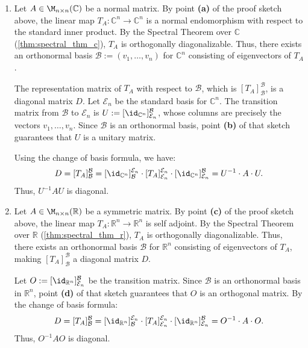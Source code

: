 \begin{exercisesolution}
\label{sol:spectral_thm_matrices}
\begin{enumerate}[label=\textbf{(\alph*)}]
    \item Let $A \in \M_{n \times n}(\mathbb{C})$ be a normal matrix. By point \textbf{(a)} of the proof sketch above, the linear map $T_A \colon \mathbb{C}^n \to \mathbb{C}^n$ is a normal endomorphism with respect to the standard inner product. By the Spectral Theorem over $\mathbb{C}$ (\cref{thm:spectral_thm_c}), $T_A$ is orthogonally diagonalizable. Thus, there exists an orthonormal basis $\mathcal{B} := (v_1, \dots, v_n)$ for $\mathbb{C}^n$ consisting of eigenvectors of $T_A$. 
    
    The representation matrix of $T_A$ with respect to $\mathcal{B}$, which is $[T_A]_{\mathcal{B}}^{\mathcal{B}}$, is a diagonal matrix $D$. Let $\mathcal{E}_n$ be the standard basis for $\mathbb{C}^n$. The transition matrix from $\mathcal{B}$ to $\mathcal{E}_n$ is $U := [\id_{\mathbb{C}^n}]_{\mathcal{E}_n}^{\mathcal{B}}$, whose columns are precisely the vectors $v_1, \dots, v_n$. Since $\mathcal{B}$ is an orthonormal basis, point \textbf{(b)} of that sketch guarantees that $U$ is a unitary matrix. 
    
    Using the change of basis formula, we have:
    \[
        D = [T_A]_{\mathcal{B}}^{\mathcal{B}} = [\id_{\mathbb{C}^n}]_{\mathcal{B}}^{\mathcal{E}_n} \cdot [T_A]_{\mathcal{E}_n}^{\mathcal{E}_n} \cdot [\id_{\mathbb{C}^n}]_{\mathcal{E}_n}^{\mathcal{B}} = U^{-1} \cdot A \cdot U.
    \]
    Thus, $U^{-1} A U$ is diagonal.
    
    \item Let $A \in \M_{n \times n}(\mathbb{R})$ be a symmetric matrix. By point \textbf{(c)} of the proof sketch above, the linear map $T_A \colon \mathbb{R}^n \to \mathbb{R}^n$ is self adjoint. By the Spectral Theorem over $\mathbb{R}$ (\cref{thm:spectral_thm_r}), $T_A$ is orthogonally diagonalizable. Thus, there exists an orthonormal basis $\mathcal{B}$ for $\mathbb{R}^n$ consisting of eigenvectors of $T_A$, making $[T_A]_{\mathcal{B}}^{\mathcal{B}}$ a diagonal matrix $D$. 
    
    Let $O := [\id_{\mathbb{R}^n}]_{\mathcal{E}_n}^{\mathcal{B}}$ be the transition matrix. Since $\mathcal{B}$ is an orthonormal basis in $\mathbb{R}^n$, point \textbf{(d)} of that sketch guarantees that $O$ is an orthogonal matrix. 
    By the change of basis formula:
    \[
        D = [T_A]_{\mathcal{B}}^{\mathcal{B}} = [\id_{\mathbb{R}^n}]_{\mathcal{B}}^{\mathcal{E}_n} \cdot [T_A]_{\mathcal{E}_n}^{\mathcal{E}_n} \cdot [\id_{\mathbb{R}^n}]_{\mathcal{E}_n}^{\mathcal{B}} = O^{-1} \cdot A \cdot O.
    \]
    Thus, $O^{-1} A O$ is diagonal.
\end{enumerate}
\end{exercisesolution}

